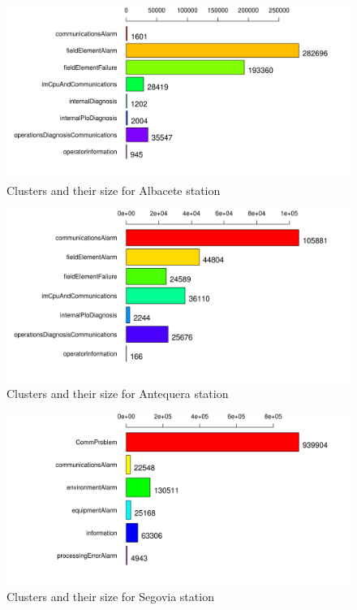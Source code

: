\documentclass[a4paper,12pt]{article}
\begin{document}
\begin{figure}[hbtp]
\includegraphics[width=\textwidth]{img/clusters_alb.png}
\caption{Clusters and their size for Albacete station} \label{fig:clusters_alb}
\end{figure}

\begin{figure}[hbtp]
\includegraphics[width=\textwidth]{img/clusters_ant.png}
\caption{Clusters and their size for Antequera station} \label{fig:clusters_ant}
\end{figure}

\begin{figure}[hbtp]
\includegraphics[width=\textwidth]{img/clusters_seg.png}
\caption{Clusters and their size for Segovia station} \label{fig:clusters_seg}
\end{figure}
\end{document}
